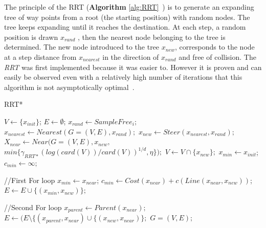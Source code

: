 \documentclass[letterpaper, 10 pt, conference]{ieeeconf}  %
\begin{document}
The principle of the RRT (\textbf{Algorithm} \ref{alg:RRT}~\cite{RRT}) is to generate an expanding tree of way points from a root (the starting position) with random nodes. The tree keeps expanding until it reaches the destination. At each step, a random position is drawn $x_{rand}$ , then the nearest node belonging to the tree is determined. The new node introduced to the tree $x_{new}$, corresponds to the node at a step distance from $x_{nearest}$ in the direction of $x_{rand}$ and free of collision. The \textit{RRT} was first implemented because it was easier to. However it is proven and can easily be observed even with a relatively high number of iterations that this algorithm is not asymptotically optimal~\cite{RRT}.\\


\begin{algorithm}
 \caption{RRT* \cite{RRT}}\label{alg:RRT2}
 \begin{algorithmic}[1]
\State $V \gets \{x_{init}\}$; $E \gets \emptyset$; 
    \State $x_{rand} \gets SampleFree_{i};$
    \State $x_{nearest} \gets Nearest(G = (V,E), x_{rand});$
    \State $x_{new} \gets Steer(x_{nearest}, x_{rand});$
        \State $X_{near} \gets Near(G = (V,E), x_{new}, $
        \State $min \{ \gamma_{RRT*}(log(card(V))/card(V))^{1/d}, \eta \});$
        \State $V \gets V \cap \{x_{new}\};$
        \State $x_{min} \gets x_{init}$; $c_{min} \gets \infty;$
        
         \hspace{1cm}  //First For loop
                \State $x_{min} \gets x_{near}$;
                \State $c_{min} \gets Cost(x_{near}) + c(Line(x_{near},x_{new}))$;
            \EndIf
        \EndFor
        \State $E \gets E\cup\{(x_{min},x_{new})\};$ 
        
        \hspace{1cm}  //Second For loop
                \State $x_{parent} \gets Parent(x_{near});$
                \State $E \gets (E\setminus\{(x_{parent},x_{near}) \cup \{(x_{new},x_{near})\};$
            \EndIf
        \EndFor
    \EndIf
\EndFor
\State \Return $G = (V,E);$
\end{algorithmic}
\end{algorithm}
\end{document}
